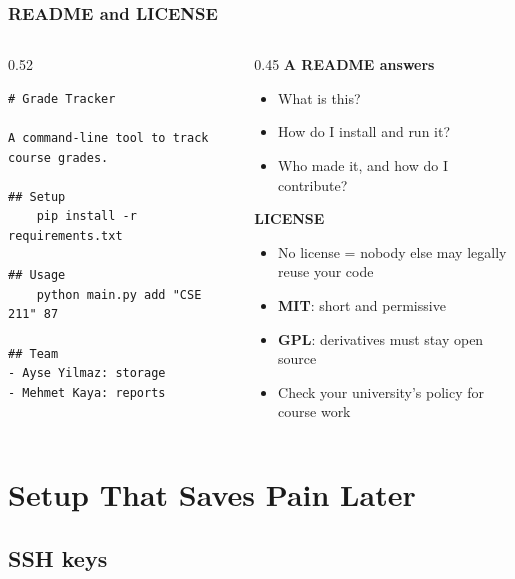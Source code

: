 \documentclass[aspectratio=169,10pt,compress]{beamer}
\begin{document}
\begin{frame}[t,fragile] \frametitle{README and LICENSE}
  \begin{columns}[T]
    \begin{column}{0.52\textwidth}
\begin{lstlisting}[language={}]
# Grade Tracker

A command-line tool to track course grades.

## Setup
    pip install -r requirements.txt

## Usage
    python main.py add "CSE 211" 87

## Team
- Ayse Yilmaz: storage
- Mehmet Kaya: reports
\end{lstlisting}
    \end{column}
    \begin{column}{0.45\textwidth}
      \textbf{A README answers}
      \begin{itemize}\small
        \item What is this?
        \item How do I install and run it?
        \item Who made it, and how do I contribute?
      \end{itemize}
      \vspace{0.3em}
      \textbf{LICENSE}
      \begin{itemize}\small
        \item No license = nobody else may legally reuse your code
        \item \textbf{MIT}: short and permissive
        \item \textbf{GPL}: derivatives must stay open source
        \item Check your university's policy for course work
      \end{itemize}
    \end{column}
  \end{columns}
\end{frame}

\section[Setup]{Setup That Saves Pain Later}

\subsection[SSH keys]{SSH keys}
\end{document}
